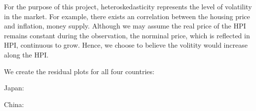 \documentclass[11pt]{article}
\begin{document}
For the purpose of this project, heteroskedasticity represents the level of volatility in the market. For example, there exists an correlation between the housing price and inflation, money supply. Although we may assume the real price of the HPI remains constant during the observation, the norminal price, which is reflected in HPI, continuous to grow. Hence, we choose to believe the volitity would increase along the HPI\citep{Heteroskedasticity1,Heteroskedasticity2}.

We create the residual plots for all four countries:

Japan:
\begin{figure}[H]
\captionsetup[subfigure]{labelformat=empty}
\centering
{}
\end{figure}

China:
\begin{figure}[H]
\captionsetup[subfigure]{labelformat=empty}
\centering
{}
\end{figure}
\end{document}
